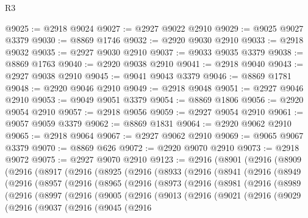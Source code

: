 \begin{lexlean}{R3}
\begin{coremodule}
@9025 := @2918 @9024
@9027 := @2927 @9022 @2910
@9029 := @9025 @9027 @3379
@9030 := @8869 @1746
@9032 := @2920 @9030 @2910
@9033 := @2918 @9032
@9035 := @2927 @9030 @2910
@9037 := @9033 @9035 @3379
@9038 := @8869 @1763
@9040 := @2920 @9038 @2910
@9041 := @2918 @9040
@9043 := @2927 @9038 @2910
@9045 := @9041 @9043 @3379
@9046 := @8869 @1781
@9048 := @2920 @9046 @2910
@9049 := @2918 @9048
@9051 := @2927 @9046 @2910
@9053 := @9049 @9051 @3379
@9054 := @8869 @1806
@9056 := @2920 @9054 @2910
@9057 := @2918 @9056
@9059 := @2927 @9054 @2910
@9061 := @9057 @9059 @3379
@9062 := @8869 @1831
@9064 := @2920 @9062 @2910
@9065 := @2918 @9064
@9067 := @2927 @9062 @2910
@9069 := @9065 @9067 @3379
@9070 := @8869 @626
@9072 := @2920 @9070 @2910
@9073 := @2918 @9072
@9075 := @2927 @9070 @2910
@9123 := @2916
    (@8901
      (@2916
        (@8909
          (@2916
            (@8917
              (@2916
                (@8925
                  (@2916
                    (@8933
                      (@2916
                        (@8941
                          (@2916
                            (@8949
                              (@2916
                                (@8957
                                  (@2916
                                    (@8965
                                      (@2916
                                        (@8973
                                          (@2916
                                            (@8981
                                              (@2916
                                                (@8989
                                                  (@2916
                                                    (@8997
                                                      (@2916
                                                        (@9005
                                                          (@2916
                                                            (@9013
                                                              (@2916
                                                                (@9021
                                                                  (@2916
                                                                    (@9029
                                                                      (@2916
                                                                        (@9037
                                                                          (@2916
                                                                            (@9045
                                                                              (@2916

\end{coremodule}
\end{lexlean}
